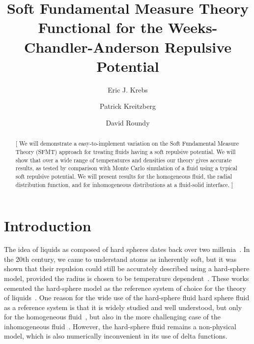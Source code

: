 \documentclass[letterpaper,twocolumn,amsmath,amssymb,prb]{revtex4-1}
\newcommand{\red}[1]{{\color{red} #1}}
\newcommand{\fixme}[1]{\red{[#1]}}
\begin{document}
\title{Soft Fundamental Measure Theory Functional for the
  Weeks-Chandler-Anderson Repulsive Potential}

\author{Eric J. Krebs}

\author{Patrick Kreitzberg}

\author{David Roundy}

\begin{abstract}
\fixme{ We will demonstrate a easy-to-implement variation on the Soft
  Fundamental Measure Theory (SFMT) approach for treating fluids
  having a soft repulsive potential.  We will show that over a wide
  range of temperatures and densities our theory gives accurate
  results, as tested by comparison with Monte Carlo simulation of a
  fluid using a typical soft repulsive potential.  We will present
  results for the homogeneous fluid, the radial distribution function,
  and for inhomogeneous distributions at a fluid-solid interface. }
\end{abstract}

\maketitle

\section{Introduction}
The idea of liquids as composed of hard spheres dates back over two
millenia~\cite{lucretius}.  In the 20th century, we came to understand
atoms as inherently soft, but it was shown that their repulsion could
still be accurately described using a hard-sphere model, provided the
radius is chosen to be temperature
dependent~\cite{rowlinson1964statistical, barker1967perturbation,
  andersen1971relationship}.  These works cemented the hard-sphere
model as the reference system of choice for the theory of
liquids~\cite{gil-villegas-1997-SAFT-VR, clark2006developing,
  lafitte2013accurate}.  One reason for the wide use of the
hard-sphere fluid hard sphere fluid as a reference system is that it
is widely studied and well understood, but only for the homogeneous
fluid~\cite{carnahan1969equation}, but also in the more challenging
case of the inhomogeneous fluid~\cite{rosenfeld1989, rosenfeld1997,
  roth2002whitebear}.  However, the hard-sphere fluid remains a
non-physical model, which is also numerically inconvenient in its use
of delta functions.
\end{document}
